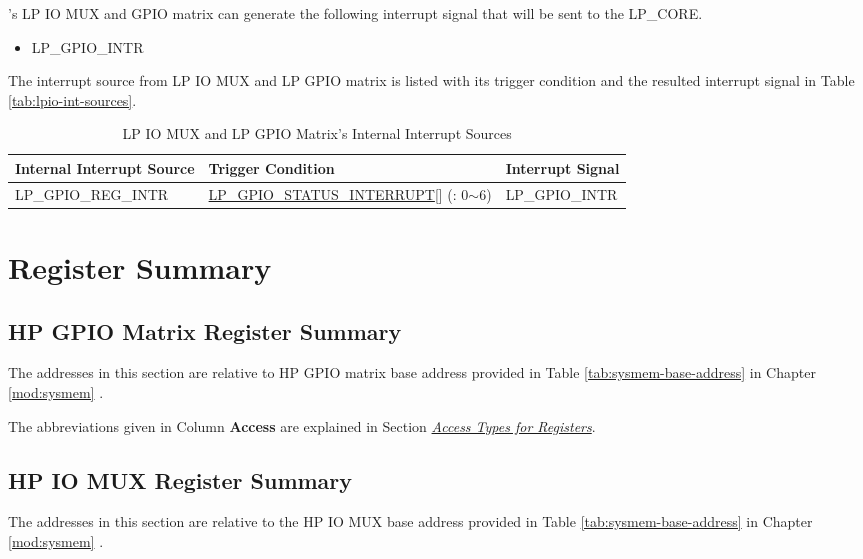 \documentclass[main\_\_EN.tex]{subfiles}
\begin{document}
\chipname{}'s LP IO MUX and GPIO matrix can generate the following interrupt signal that will be sent to the LP\_CORE.

    \begin{itemize}
        \item LP\_GPIO\_INTR
    \end{itemize}

The interrupt source from LP IO MUX and LP GPIO matrix is listed with its trigger condition and the resulted interrupt signal in Table \ref{tab:lpio-int-sources}.
\begin{longtable}{ | L{5cm} | L{7.0cm} | L{3.5cm} | }
\caption{LP IO MUX and LP GPIO Matrix's Internal Interrupt Sources} \label{tab:lpio-int-sources}
\\ \hline
{}
\textbf{Internal Interrupt Source} & \textbf{Trigger Condition}  &  \textbf{Interrupt Signal}\\ \hline

\label{int:LPGPIOINT}LP\_GPIO\_REG\_INTR  &  \hyperref[fielddesc:LPGPIOSTATUSINTERRUPT]{LP\_GPIO\_STATUS\_INTERRUPT}[] (: 0$\sim$6) &  LP\_GPIO\_INTR  \\ \hline
\end{longtable}

\hypertarget{iomuxgpio-reg-summ}{}
\section{Register Summary}
\subsection{HP GPIO Matrix Register Summary}
\label{sec:hp-gpio-reg-summ}
The addresses in this section are relative to HP GPIO matrix base address provided in Table \ref{tab:sysmem-base-address} in Chapter \ref{mod:sysmem} \textit{}.

The abbreviations given in Column \textbf{Access} are explained in Section \hyperref[glossary-access-types]{\textit{Access Types for Registers}}.




\subsection{HP IO MUX Register Summary}
The addresses in this section are relative to the HP IO MUX base address provided in Table \ref{tab:sysmem-base-address} in Chapter \ref{mod:sysmem} \textit{}.
\end{document}
